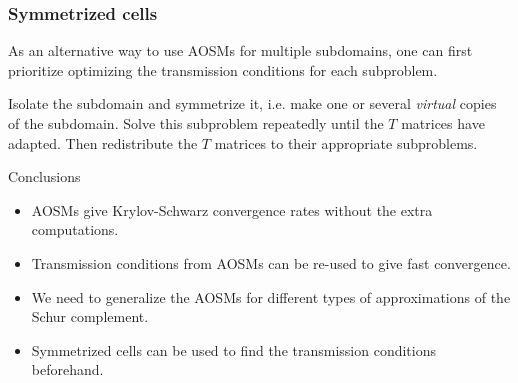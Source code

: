 \documentclass{beamer}
\begin{document}
%
%
%

\begin{frame}[fragile]
\frametitle{Symmetrized cells}

As an alternative way to use AOSMs for multiple subdomains,
one can first prioritize optimizing the transmission conditions for each subproblem.

Isolate the subdomain and symmetrize it, i.e. make one or several \textit{virtual} copies of the subdomain.
Solve this subproblem repeatedly until the $T$ matrices have adapted.
Then redistribute the $T$ matrices to their appropriate subproblems.

\begin{figure}
	\centering
\end{figure}
\end{frame}

\begin{frame}{Conclusions}
\begin{itemize}
\item AOSMs give Krylov-Schwarz convergence rates without the extra computations.
\item Transmission conditions from AOSMs can be re-used to give fast convergence.
\item We need to generalize the AOSMs for different types of approximations of the Schur complement.
\item Symmetrized cells can be used to find the transmission conditions beforehand.
\end{itemize}
\end{frame}
\end{document}
